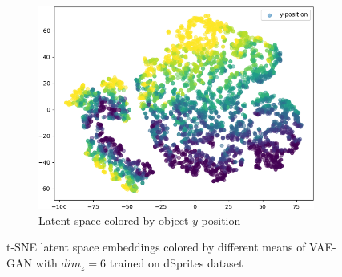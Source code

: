 \documentclass[11pt,a4paper]{article}
\begin{document}
\begin{figure}[H]
\begin{subfigure}{.19\textwidth}
\includegraphics[width=\textwidth]{images/latent_spaces/dsprites/vae_gan/embeddings_mu_4.png}
\caption{Latent space colored by object $y$-position}
\end{subfigure}
\caption[\ac{VAE}-\ac{GAN} Latent Space - dSprites]{\ac{t-SNE} latent space embeddings colored by different means of \ac{VAE}-\ac{GAN} with $dim_z=6$ trained on dSprites dataset}
\label{fig:vae_gan_latent_space_dsprites}
\end{figure}
\end{document}
